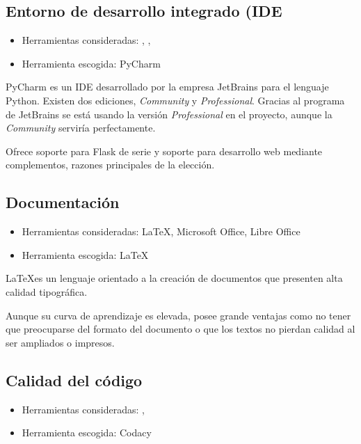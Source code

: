 \subsection{Entorno de desarrollo integrado (IDE}

\begin{itemize}
	\tightlist
	\item Herramientas consideradas: , , 
	\item Herramienta escogida: PyCharm
\end{itemize}

PyCharm es un IDE desarrollado por la empresa JetBrains para el lenguaje Python. Existen dos ediciones, \textit{Community} y \textit{Professional}. Gracias al programa  de JetBrains se está usando la versión \textit{Professional} en el proyecto, aunque la \textit{Community} serviría perfectamente.

Ofrece soporte para Flask de serie y soporte para desarrollo web mediante complementos, razones principales de la elección.

\subsection{Documentación}

\begin{itemize}
	\tightlist
	\item Herramientas consideradas: \LaTeX, Microsoft Office, Libre Office
	\item Herramienta escogida: \LaTeX
\end{itemize}

\LaTeX es un lenguaje orientado a la creación de documentos que presenten alta calidad tipográfica.

Aunque su curva de aprendizaje es elevada, posee grande ventajas como no tener que preocuparse del formato del documento o que los textos no pierdan calidad al ser ampliados o impresos.

\subsection{Calidad del código}

\begin{itemize}
	\tightlist
	\item Herramientas consideradas: , 
	\item Herramienta escogida: Codacy
\end{itemize}

